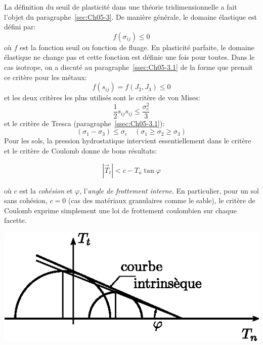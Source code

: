 La définition du seuil de plasticité dans une théorie tridimensionnelle a fait l'objet du paragraphe~\ref{sec:Ch05-3}.
De manière générale, le domaine élastique est défini par: 
\begin{equation}
    f\left( \sigma_{ij} \right) \leq 0
    \label{eq:Ch10-009}
\end{equation}
où $f$ est la fonction seuil ou fonction de fluage.
En plasticité parfaite, le domaine élastique ne change pas et cette fonction est définie une fois pour toutes.
Dans le cas isotrope, on a discuté au paragraphe~\ref{ssec:Ch05-3.1} de la forme que prenait ce critère pour les métaux: 
\begin{equation}
    f\left( s_{ij} \right) = f\left( J_2,J_3 \right) \leq 0
    \label{eq:Ch10-010}
\end{equation}
et les deux critères les plus utilisés sont le critère de von Mises: 
\begin{equation}
    \frac{1}{2} s_{ij} s_{ij} \leq \frac{\sigma_e^2}{3}
    \label{eq:Ch10-011}
\end{equation}
et le critère de Tresca (paragraphe~\ref{ssec:Ch05-3.1}): 
\begin{equation}
    \left( \sigma_1 - \sigma_3 \right) \leq \sigma_e \quad \left( \sigma_1 \geq \sigma_2 \geq \sigma_3 \right)
    \label{eq:Ch10-012}
\end{equation}
Pour les sols, la pression hydrostatique intervient essentiellement dans le critère et le critère de Coulomb
donne de bons résultats: 
\begin{defn}
\begin{equation}
        |\vec{T}_t| < c - T_n \tan \varphi
        \label{eq:Ch10-013}
    \end{equation}
\end{defn}
où $c$ est la \emph{cohésion} et $\varphi$, l'\emph{angle de frottement interne}.
En particulier, pour un sol sans cohésion, $c = 0$ (cas des matériaux granulaires comme le sable), le critère de Coulomb exprime simplement une loi de frottement coulombien sur chaque facette. 

\begin{center}
    \includegraphics{../images/T1_Ch10-07}
\end{center}

